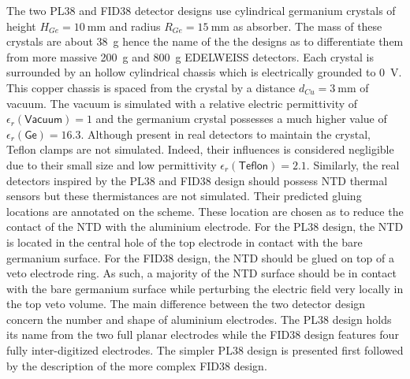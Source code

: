 The two PL38 and FID38 detector designs use cylindrical germanium crystals of height $H_{Ge} = \SI{10}{\mm}$ and radius $R_{Ge} = \SI{15}{\mm}$ as absorber. The mass of these crystals are about \SI{38}{\g} hence the name of the the designs as to differentiate them from more massive \SI{200}{\g} and \SI{800}{\g} EDELWEISS detectors. Each crystal is surrounded by an hollow cylindrical chassis which is electrically grounded to \SI{0}{\volt}. This copper chassis is spaced from the crystal by a distance $d_{Cu} = \SI{3}{\mm}$ of vacuum.
The vacuum is simulated with a relative electric permittivity of $\epsilon_r(\textsf{Vacuum}) = 1$ and the germanium crystal possesses a much higher value of $\epsilon_r (\textsf{Ge}) = 16.3$. Although present in real detectors to maintain the crystal, Teflon clamps are not simulated. Indeed, their influences is considered negligible due to their small size and low permittivity $\epsilon_r(\textsf{Teflon})=2.1$.
Similarly, the real detectors inspired by the PL38 and FID38 design should possess NTD thermal sensors but these thermistances are not simulated. Their predicted gluing locations are annotated on the scheme. These location are chosen as to reduce the contact of the NTD with the aluminium electrode. For the PL38 design, the NTD is located in the central hole of the top electrode in contact with the bare germanium surface. For the FID38 design, the NTD should be glued on top of a veto electrode ring. As such, a majority of the NTD surface should be in contact with the bare germanium surface while perturbing the electric field very locally in the top veto volume.
The main difference between the two detector design concern the number and shape of aluminium electrodes. The PL38 design holds its name from the two full planar electrodes while the FID38 design features four fully inter-digitized electrodes. The simpler PL38 design is presented first followed by the description of the more complex FID38 design.


